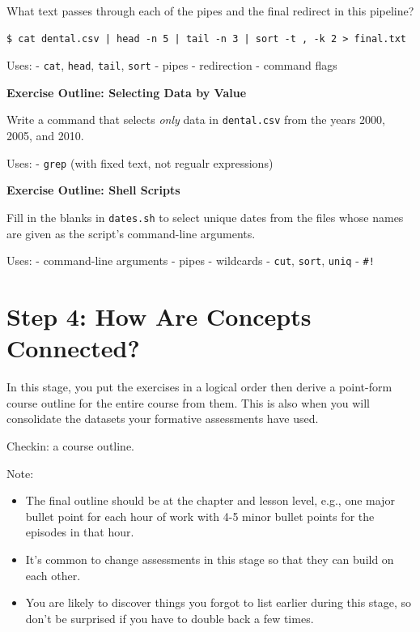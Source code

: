 \documentclass[10pt,statementpaper]{memoir}
\begin{document}
What text passes through each of the pipes and the final redirect in
this pipeline?

\begin{verbatim}
$ cat dental.csv | head -n 5 | tail -n 3 | sort -t , -k 2 > final.txt
\end{verbatim}

Uses: - \texttt{cat}, \texttt{head}, \texttt{tail}, \texttt{sort} -
pipes - redirection - command flags

\textbf{Exercise Outline: Selecting Data by Value}

Write a command that selects \emph{only} data in \texttt{dental.csv}
from the years 2000, 2005, and 2010.

Uses: - \texttt{grep} (with fixed text, not regualr expressions)

\textbf{Exercise Outline: Shell Scripts}

Fill in the blanks in \texttt{dates.sh} to select unique dates from the
files whose names are given as the script's command-line arguments.

Uses: - command-line arguments - pipes - wildcards - \texttt{cut},
\texttt{sort}, \texttt{uniq} - \texttt{\#!}

\section{Step 4: How Are Concepts
Connected?}\label{step-4-how-are-concepts-connected}

In this stage, you put the exercises in a logical order then derive a
point-form course outline for the entire course from them. This is also
when you will consolidate the datasets your formative assessments have
used.

Checkin: a course outline.

Note:

\begin{itemize}
\item
  The final outline should be at the chapter and lesson level, e.g., one
  major bullet point for each hour of work with 4-5 minor bullet points
  for the episodes in that hour.
\item
  It's common to change assessments in this stage so that they can build
  on each other.
\item
  You are likely to discover things you forgot to list earlier during
  this stage, so don't be surprised if you have to double back a few
  times.
\end{itemize}
\end{document}
